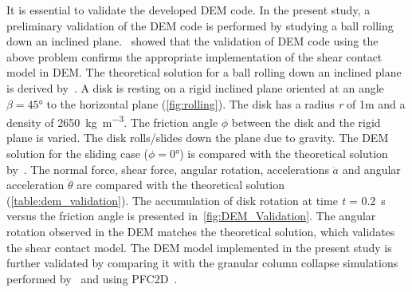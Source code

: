 It is essential to validate the developed DEM code. In the present study, a 
preliminary validation of the DEM code is performed by studying a ball rolling 
down an inclined plane.~\citet{O'Sullivan2003} showed that the validation of 
DEM code using the above problem confirms the appropriate implementation of 
the shear contact model in DEM. The theoretical solution for a ball rolling 
down an inclined plane is derived by~\cite{Ke1995}. A disk is resting on a 
rigid inclined plane oriented at an angle $\beta = 45\si{\degree}$ to the 
horizontal plane (\cref{fig:rolling}). The disk has a radius \textit{r} of 
1\si{m} and a 
density of 2650~\si{\kg\per\m\cubed}. The friction angle $\phi$ between the 
disk and the rigid plane is varied. The disk rolls/slides down the plane due to 
gravity. The DEM solution for the sliding case ($\phi=0\si{\degree}$) is 
compared with the theoretical solution by~\citet{Ke1995}. The normal force, 
shear force, angular rotation, accelerations $\ddot{a}$ and angular 
acceleration $\ddot{\theta}$ are compared with the theoretical solution 
(\cref{table:dem_validation}). The accumulation of disk rotation at time 
\textit{t} = 0.2~\si{\s} versus the friction angle is presented 
in~\cref{fig:DEM_Validation}. The angular rotation observed in the DEM matches 
the theoretical solution, which validates the shear contact model. 
The DEM model implemented in the present study is further validated by 
comparing it with the granular column collapse simulations performed 
by~\citet{Zenit2005} and using PFC2D~\citep{ItascaPFC2D1998}.


